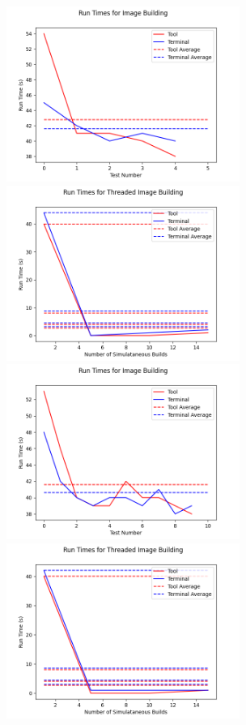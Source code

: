 \begin{figure}[h!]
  \centering
  \includegraphics[width=3in]{images/evaluation/run5/image-build}
  \includegraphics[width=3in]{images/evaluation/run5/thread-image-build}
  \includegraphics[width=3in]{images/evaluation/run6/image-build}
  \includegraphics[width=3in]{images/evaluation/run6/thread-image-build}

\end{figure}
